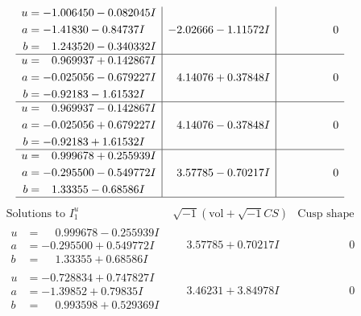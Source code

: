 \documentclass[1p]{elsarticle_modified}
\theoremstyle{definition}
\newcommand{\I}{\sqrt{-1}}
\begin{document}
$$\begin{array}{c|c|c}
\begin{aligned}
u &= -1.006450 - 0.082045 I \\
a &= -1.41830 - 0.84737 I \\
b &= \phantom{-}1.243520 - 0.340332 I\end{aligned}
 & -2.02666 - 1.11572 I & \phantom{-0.000000 } 0 \\ \hline\begin{aligned}
u &= \phantom{-}0.969937 + 0.142867 I \\
a &= -0.025056 - 0.679227 I \\
b &= -0.92183 - 1.61532 I\end{aligned}
 & \phantom{-}4.14076 + 0.37848 I & \phantom{-0.000000 } 0 \\ \hline\begin{aligned}
u &= \phantom{-}0.969937 - 0.142867 I \\
a &= -0.025056 + 0.679227 I \\
b &= -0.92183 + 1.61532 I\end{aligned}
 & \phantom{-}4.14076 - 0.37848 I & \phantom{-0.000000 } 0 \\ \hline\begin{aligned}
u &= \phantom{-}0.999678 + 0.255939 I \\
a &= -0.295500 - 0.549772 I \\
b &= \phantom{-}1.33355 - 0.68586 I\end{aligned}
 & \phantom{-}3.57785 - 0.70217 I & \phantom{-0.000000 } 0\\
 \hline 
 \end{array}$$\newpage$$\begin{array}{c|c|c}  
\text{Solutions to }I^u_{1}& \I (\text{vol} + \sqrt{-1}CS) & \text{Cusp shape}\\
 \hline 
\begin{aligned}
u &= \phantom{-}0.999678 - 0.255939 I \\
a &= -0.295500 + 0.549772 I \\
b &= \phantom{-}1.33355 + 0.68586 I\end{aligned}
 & \phantom{-}3.57785 + 0.70217 I & \phantom{-0.000000 } 0 \\ \hline\begin{aligned}
u &= -0.728834 + 0.747827 I \\
a &= -1.39852 + 0.79835 I \\
b &= \phantom{-}0.993598 + 0.529369 I\end{aligned}
 & \phantom{-}3.46231 + 3.84978 I & \phantom{-0.000000 } 0 \\ \hline\begin{aligned}

\end{aligned}
\end{array}$$
\end{document}
